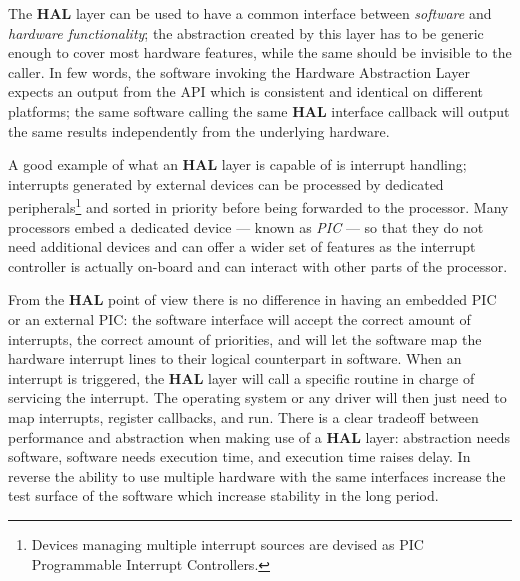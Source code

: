 \documentclass[11pt,b5paper]{scrbook}
\begin{document}
The \textbf{HAL} layer can be used to have a common interface between
\textit{software} and \textit{hardware functionality}; the abstraction created
by this layer has to be generic enough to cover most hardware features, while
the same should be invisible to the caller.
In few words, the software invoking the Hardware Abstraction Layer expects an
output from the API which is consistent and identical on different platforms;
the same software calling the same \textbf{HAL} interface callback will output the same
results independently from the underlying hardware.

A good example of what an \textbf{HAL} layer is capable of is interrupt handling;
interrupts generated by external devices can be processed by
dedicated peripherals\footnote{Devices managing multiple interrupt sources
are devised as PIC Programmable Interrupt Controllers.} and sorted in priority
before being forwarded to the processor. Many processors embed a dedicated device --- known
as \textit{PIC} --- so that they do not need additional devices and can offer a wider set of features
as the interrupt controller is actually on-board and can interact with other
parts of the processor.

From the \textbf{HAL} point of view there is no difference in having an
embedded PIC or an external PIC: the software interface will accept the
correct amount of interrupts, the correct amount of priorities, and will let
the software map the hardware interrupt lines to their logical counterpart in
software. When an interrupt is triggered, the \textbf{HAL} layer will call a
specific routine in charge of servicing the interrupt.
The operating system or any driver will then just need to map interrupts,
register callbacks, and run.
There is a clear tradeoff between performance and abstraction when making use
of a \textbf{HAL} layer: abstraction needs software, software needs execution time,
and execution time raises delay.
In reverse the ability to use multiple hardware with the same interfaces increase
the test surface of the software which increase stability in the long period.
\end{document}

